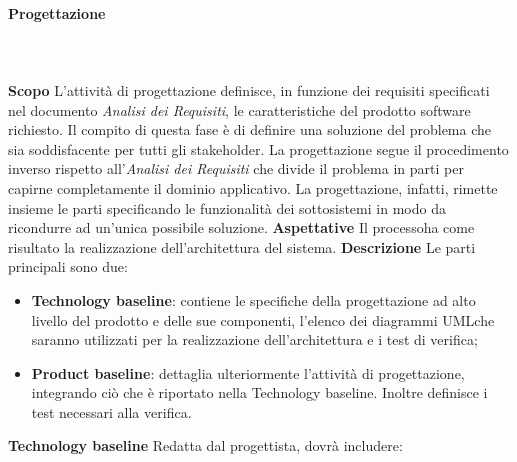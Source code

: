 		\paragraph{Progettazione} \mbox{}\\ \mbox{}\\
			\textbf{Scopo} \newline \newline
			L'attività di progettazione definisce, in funzione dei requisiti specificati nel documento \textit{Analisi dei Requisiti}, le caratteristiche del prodotto software richiesto. Il compito di questa fase è di definire una soluzione del problema che sia soddisfacente per tutti gli stakeholder. La progettazione segue il procedimento inverso rispetto all'\textit{Analisi dei Requisiti} che divide il problema in parti per capirne completamente il dominio applicativo. La progettazione, infatti, rimette insieme le parti specificando le funzionalità dei sottosistemi in modo da ricondurre ad un'unica possibile soluzione. \newline \newline
			\textbf{Aspettative} \newline \newline
			Il processo\glosp ha come risultato la realizzazione dell’architettura del sistema. \newline \newline
			\textbf{Descrizione} \newline \newline
			Le parti principali sono due:
			\begin{itemize}
				\item \textbf{Technology baseline}\glo: contiene le specifiche della progettazione ad alto livello del prodotto e delle sue componenti, l'elenco dei diagrammi UML\glosp che saranno utilizzati per la realizzazione dell'architettura e i test di verifica;
				\item \textbf{Product baseline}\glo: dettaglia ulteriormente l'attività di progettazione, integrando ciò che è riportato nella Technology baseline. Inoltre definisce i test necessari alla verifica.
			\end{itemize}
			\textbf{Technology baseline} \newline \newline
			Redatta dal progettista, dovrà includere:
